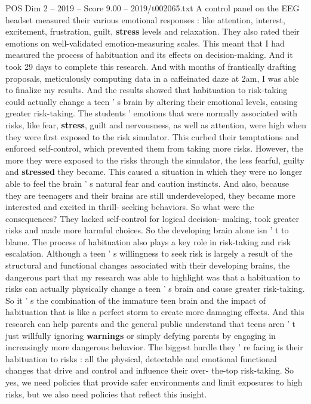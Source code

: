 \begin{textsample}{POS Dim 2 – 2019 – Score 9.00 – 2019/t002065.txt}
A control panel on the EEG headset measured their various emotional responses : like attention, interest, excitement, frustration, guilt, \textbf{stress} levels and relaxation.
They also rated their emotions on well-validated emotion-measuring scales.
This meant that I had measured the process of habituation and its effects on decision-making.
And it took 29 days to complete this research.
And with months of frantically drafting proposals, meticulously computing data in a caffeinated daze at 2am, I was able to finalize my results.
And the results showed that habituation to risk-taking could actually change a teen ' s brain by altering their emotional levels, causing greater risk-taking.
The students ' emotions that were normally associated with risks, like fear, \textbf{stress}, guilt and nervousness, as well as attention, were high when they were first exposed to the risk simulator.
This curbed their temptations and enforced self-control, which prevented them from taking more risks.
However, the more they were exposed to the risks through the simulator, the less fearful, guilty and \textbf{stressed} they became.
This caused a situation in which they were no longer able to feel the brain ' s natural fear and caution instincts.
And also, because they are teenagers and their brains are still underdeveloped, they became more interested and excited in thrill- seeking behaviors.
So what were the consequences?
They lacked self-control for logical decision- making, took greater risks and made more harmful choices.
So the developing brain alone isn ' t to blame.
The process of habituation also plays a key role in risk-taking and risk escalation.
Although a teen ' s willingness to seek risk is largely a result of the structural and functional changes associated with their developing brains, the dangerous part that my research was able to highlight was that a habituation to risks can actually physically change a teen ' s brain and cause greater risk-taking.
So it ' s the combination of the immature teen brain and the impact of habituation that is like a perfect storm to create more damaging effects.
And this research can help parents and the general public understand that teens aren ' t just willfully ignoring \textbf{warnings} or simply defying parents by engaging in increasingly more dangerous behavior.
The biggest hurdle they ' re facing is their habituation to risks : all the physical, detectable and emotional functional changes that drive and control and influence their over- the-top risk-taking.
So yes, we need policies that provide safer environments and limit exposures to high risks, but we also need policies that reflect this insight.

\end{textsample}
